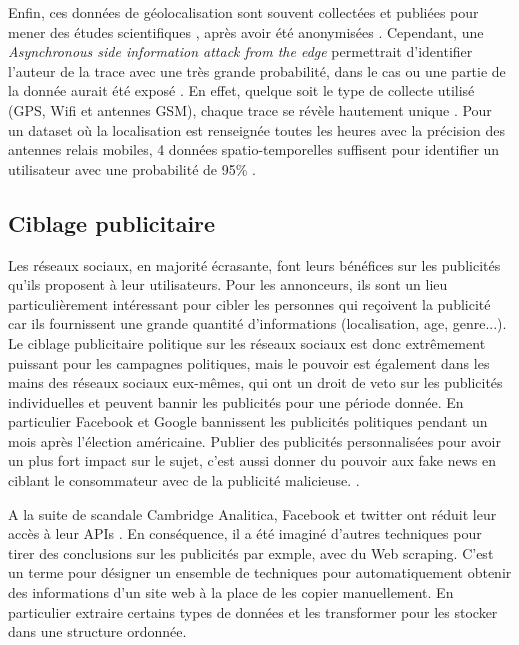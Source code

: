 \documentclass[runningheads]{llncs}
\begin{document}
Enfin, ces données de géolocalisation sont souvent collectées et publiées pour mener des études scientifiques \cite{mokhtar_privamov_2017}, après avoir été anonymisées \cite{primault_privacy-preserving_2015}. Cependant, une \textit{Asynchronous side information attack from the edge} permettrait d'identifier l'auteur de la trace avec une très grande probabilité, dans le cas ou une partie de la donnée aurait été exposé \cite{zhang_asynchronous_2018}. En effet, quelque soit le type de collecte utilisé (GPS, Wifi et antennes GSM), chaque trace se révèle hautement unique \cite{boutet_uniqueness_2016}. Pour un dataset où la localisation est renseignée toutes les heures avec la précision des antennes relais mobiles, 4 données spatio-temporelles suffisent pour identifier un utilisateur avec une probabilité de 95\% \cite{montjoye_unique_2013}.


\subsection{Ciblage publicitaire}

Les réseaux sociaux, en majorité écrasante, font leurs bénéfices sur les publicités qu'ils proposent à leur utilisateurs. Pour les annonceurs, ils sont un lieu particulièrement intéressant pour cibler les personnes qui reçoivent la publicité car ils fournissent une grande quantité d'informations (localisation, age, genre...). Le ciblage publicitaire politique sur les réseaux sociaux est donc extrêmement puissant pour les campagnes politiques, mais le pouvoir est également dans les mains des réseaux sociaux eux-mêmes, qui ont un droit de veto sur les publicités individuelles et peuvent bannir les publicités pour une période donnée. En particulier Facebook et Google bannissent les publicités politiques pendant un mois après l'élection américaine. \cite{facebook_facebook_2020} Publier des publicités personnalisées pour avoir un plus fort impact sur le sujet, c'est aussi donner du pouvoir aux fake news en ciblant le consommateur avec de la publicité malicieuse. \cite{ribeiro_microtargeting_2019}. 


A la suite de scandale Cambridge Analitica, Facebook et twitter ont réduit leur accès à leur APIs \cite{axel_bruns_after_2019}. En conséquence, il a été imaginé d'autres techniques pour tirer des conclusions sur les publicités par exmple, avec du Web scraping. C'est un terme pour désigner un ensemble de techniques pour automatiquement obtenir des informations d'un site web à la place de les copier manuellement. En particulier extraire certains types de données et les transformer pour les stocker dans une structure ordonnée. \\
\end{document}
